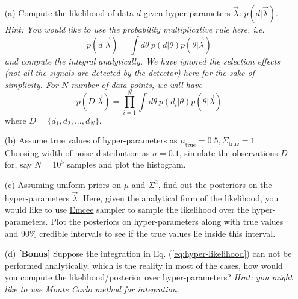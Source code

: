 \documentclass{article} %
\begin{document}
    \begin{enumerate}
        \item[(a)] Compute the likelihood of data $d$ given hyper-parameters $\Vec{\lambda}$: $p(d|\Vec{\lambda})$.
    \textit{Hint: You would like to use the probability multiplicative rule here, i.e.}
    \begin{equation}
        p(d|\Vec{\lambda}) =  \int d\theta \ p(d|\theta) p(\theta|\Vec{\lambda})
        \label{eq:hyper-likelihood}
    \end{equation}
    \textit{and compute the integral analytically. We have ignored the selection effects (not all the signals are detected by the detector) here for the sake of simplicity. For $N$ number of data points, we will have}
    \begin{equation}
        p(D|\Vec{\lambda}) =  \prod_{i=1}^{N}\int d \theta \ p(d_i|\theta) p(\theta|\Vec{\lambda})
    \end{equation}
    where $D = \{d_1, d_2, ..., d_N\}$. 
    
    \item[(b)] Assume true values of hyper-parameters as $\mu_{\mathrm{true}} = 0.5, \Sigma_{\mathrm{true}} = 1$. Choosing width of noise distribution as $\sigma = 0.1$, simulate the observations $D$ for, say $N=10^5$ samples and plot the histogram.
    
    \item[(c)] Assuming uniform priors on $\mu$ and $\Sigma^2$, find out the posteriors on the hyper-parameters $\Vec{\lambda}$. Here, given the analytical form of the likelihood, you would like to use \href{https://users.obs.carnegiescience.edu/cburns/ipynbs/Emcee.html}{Emcee} sampler to sample the likelihood over the hyper-parameters. Plot the posteriors on hyper-parameters along with true values and $90\%$ credible intervals to see if the true values lie inside this interval.
    
    \item[(d)] \textbf{[Bonus]} Suppose the integration in Eq. (\ref{eq:hyper-likelihood}) can not be performed analytically, which is the reality in most of the cases, how would you compute the likelihood/posterior over hyper-parameters? \textit{Hint: you might like to use Monte Carlo method for integration.}


\end{enumerate}
\end{document}
